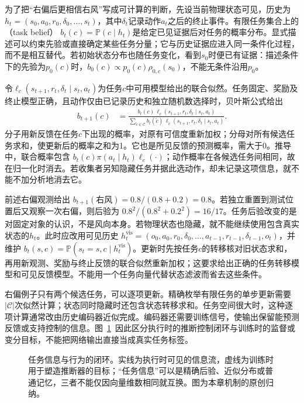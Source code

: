 为了把“右偏后更相信右风”写成可计算的判断，先设当前物理状态可见，历史为
$h_t=(s_0,a_0,r_0,\delta_0,\ldots,s_t)$，其中$\delta_t$记录动作$a_t$之后的终止事件。有限任务集合上的（task belief）
$b_t(c)=\mathbb P(c\mid h_t)$是给定已见证据后对任务的概率分布。显式描述可以约束先验或直接确定某些任务分量；它与历史证据应进入同一条件化过程，而不是相互替代。若初始状态分布也随任务变化，看到$s_0$时便已有证据：描述条件下的先验为$p_0(c)$时，$b_0(c)\propto p_0(c)\rho_{0,c}(s_0)$，不能无条件沿用$p_0$。

令$\ell_c(s_{t+1},r_t,\delta_t\mid s_t,a_t)$为任务$c$中可用模型给出的联合似然。任务固定、奖励及终止模型正确，且动作仅由已记录历史和独立随机数选择时，贝叶斯公式给出
\begin{align}
 b_{t+1}(c)
 &=\frac{b_t(c)\,
     \ell_c(s_{t+1},r_t,\delta_t\mid s_t,a_t)}
 {\sum_{\widetilde c\in\mathcal C}b_t(\widetilde c)\,
     \ell_{\widetilde c}(s_{t+1},r_t,\delta_t\mid s_t,a_t)}.
 \label{eq:rl-transfer-belief-update}
\end{align}
分子用新反馈在任务$c$下出现的概率，对原有可信度重新加权；分母对所有候选任务求和，使更新后的概率之和为1。它也是所见反馈的预测概率，需大于0。推导中，联合概率包含
$b_t(c)\pi(a_t\mid h_t)\ell_c(\cdot)$；动作概率在各候选任务间相同，故在归一化时消去。若收集者另知隐藏任务并据此选动作，却未记录这项信息，就不能不加分析地消去它。

前述右偏观测给出
$b_{t+1}(\text{右风})=0.8/(0.8+0.2)=0.8$。若独立重置到测试位置后又观察一次右偏，则后验为
$0.8^2/(0.8^2+0.2^2)=16/17$。任务后验改变的是对固定对象的认识，不是风向本身。若物理状态也隐藏，就不能继续使用包含真实状态的$h_t$。此时应改用可见历史
$h_t^{\mathrm{vis}}=(o_0,a_0,r_0,\delta_0,\ldots,a_{t-1},r_{t-1},\delta_{t-1},o_t)$，并维护
$b_t(s,c)=\mathbb P(s_t=s,c\mid h_t^{\mathrm{vis}})$。更新时先按任务$c$的转移核对旧状态求和，再用新观测、奖励与终止反馈的联合似然重新加权；这要求给出正确的任务转移模型和可见反馈模型。不能用一个任务向量代替状态滤波而省去这些条件。

右偏例子只有两个候选任务，可以逐项更新。精确枚举有限任务的单步更新需要$|\mathcal C|$次似然计算；状态同时隐藏时还包含状态转移求和。任务空间很大时，这种逐项计算通常改由历史编码器近似完成。编码器还需要训练信号，使输出保留能预测反馈或支持控制的信息。图~\ref{fig:rl-transfer-belief-loop}~因此区分执行时的推断控制闭环与训练时的监督或变分目标，不能把网络输出直接当成真实任务标签。

\begin{figure}[htbp]
 \centering
 
 \caption{任务信息与行为的闭环。实线为执行时可见的信息流，虚线为训练时用于塑造推断器的目标；“任务信息”可以是精确后验、近似分布或普通记忆，三者不能仅因向量维数相同就互换。图为本章机制的原创归纳。}
 \label{fig:rl-transfer-belief-loop}
\end{figure}

